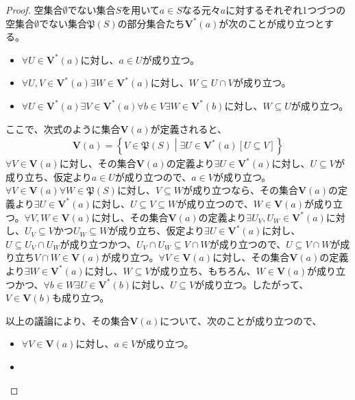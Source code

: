 \documentclass[dvipdfmx]{jsarticle}
\begin{document}
\begin{proof}
空集合$\emptyset$でない集合$S$を用いて$a \in S$なる元々$a$に対するそれぞれ1つづつの空集合$\emptyset$でない集合$\mathfrak{P}(S)$の部分集合たち$\mathbf{V}^{*}(a)$が次のことが成り立つとする。
\begin{itemize}
\item
  $\forall U \in \mathbf{V}^{*}(a)$に対し、$a \in U$が成り立つ。
\item
  $\forall U,V \in \mathbf{V}^{*}(a)\exists W \in \mathbf{V}^{*}(a)$に対し、$W \subseteq U \cap V$が成り立つ。
\item
  $\forall U \in \mathbf{V}^{*}(a)\exists V \in \mathbf{V}^{*}(a)\forall b \in V\exists W \in \mathbf{V}^{*}(b)$に対し、$W \subseteq U$が成り立つ。
\end{itemize}\par
ここで、次式のように集合$\mathbf{V}(a)$が定義されると、
\begin{align*}
\mathbf{V}(a) = \left\{ V \in \mathfrak{P}(S) \middle| \exists U \in \mathbf{V}^{*}(a)[ U \subseteq V] \right\}
\end{align*}
$\forall V \in \mathbf{V}(a)$に対し、その集合$\mathbf{V}(a)$の定義より$\exists U \in \mathbf{V}^{*}(a)$に対し、$U \subseteq V$が成り立ち、仮定より$a \in U$が成り立つので、$a \in V$が成り立つ。$\forall V \in \mathbf{V}(a)\forall W \in \mathfrak{P}(S)$に対し、$V \subseteq W$が成り立つなら、その集合$\mathbf{V}(a)$の定義より$\exists U \in \mathbf{V}^{*}(a)$に対し、$U \subseteq V \subseteq W$が成り立つので、$W \in \mathbf{V}(a)$が成り立つ。$\forall V,W \in \mathbf{V}(a)$に対し、その集合$\mathbf{V}(a)$の定義より$\exists U_{V},U_{W} \in \mathbf{V}^{*}(a)$に対し、$U_{V} \subseteq V$かつ$U_{W} \subseteq W$が成り立ち、仮定より$\exists U \in \mathbf{V}^{*}(a)$に対し、$U \subseteq U_{V} \cap U_{W}$が成り立つかつ、$U_{V} \cap U_{W} \subseteq V \cap W$が成り立つので、$U \subseteq V \cap W$が成り立ち$V \cap W \in \mathbf{V}(a)$が成り立つ。$\forall V \in \mathbf{V}(a)$に対し、その集合$\mathbf{V}(a)$の定義より$\exists W \in \mathbf{V}^{*}(a)$に対し、$W \subseteq V$が成り立ち、もちろん、$W \in \mathbf{V}(a)$が成り立つかつ、$\forall b \in W\exists U \in \mathbf{V}^{*}(b)$に対し、$U \subseteq V$が成り立つ。したがって、$V \in \mathbf{V}(b)$も成り立つ。\par
以上の議論により、その集合$\mathbf{V}(a)$について、次のことが成り立つので、
\begin{itemize}
\item
  $\forall V \in \mathbf{V}(a)$に対し、$a \in V$が成り立つ。
\item

\end{itemize}
\end{proof}
\end{document}

